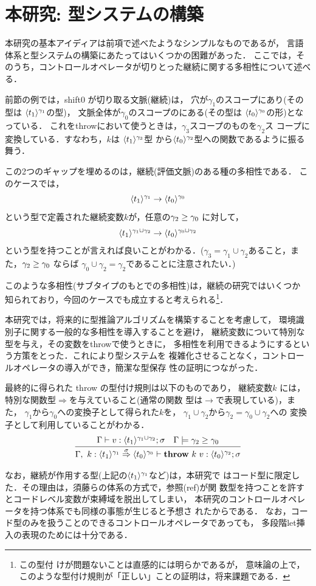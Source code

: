 \section{本研究: 型システムの構築}

本研究の基本アイディアは前項で述べたようなシンプルなものであるが，
言語体系と型システムの構築にあたってはいくつかの困難があった．
ここでは，そのうち，コントロールオペレータが切りとった継続に関する多相性について述べる．

前節の例では，shift0 が切り取る文脈(継続)は，
穴が$\gamma_1$のスコープにあり(その型は $\langle{t_1}\rangle^{\gamma_1}$の型)，
文脈全体が$\gamma_0$のスコープのにある(その型は
$\langle{t_0}\rangle^{\gamma_0}$の形)となっている．
これをthrowにおいて使うときは，$\gamma_3$スコープのものを$\gamma_2$ス
コープに変換している．すなわち，$k$は $\langle{t_1}\rangle^{\gamma_3}$型
から$\langle{t_0}\rangle^{\gamma_2}$型への関数であるように振る舞う．

この2つのギャップを埋めるのは，継続(評価文脈)のある種の多相性である．
このケースでは，
\[\langle{t_1}\rangle^{\gamma_1} \to \langle{t_0}\rangle^{\gamma_0} \]
という型で定義された継続変数$k$が，任意の$\gamma_2 \ge \gamma_0$ に対して，
\[\langle{t_1}\rangle^{\gamma_1 \cup \gamma_2} \to \langle{t_0}\rangle^{\gamma_0 \cup \gamma_2} \]
という型を持つことが言えれば良いことがわかる．($\gamma_3 = \gamma_1
\cup \gamma_2$あること，また，$\gamma_2 \ge \gamma_0$ ならば
$\gamma_0 \cup \gamma_2 = \gamma_2$であることに注意されたい．)

このような多相性(サブタイプのもとでの多相性)は，継続の研究ではいくつか
知られており，今回のケースでも成立すると考えられる\footnote{この型付
けが問題ないことは直感的には明らかであるが，
意味論の上で，このような型付け規則が「正しい」ことの証明は，将来課題である．}．

本研究では，将来的に型推論アルゴリズムを構築することを考慮して，
環境識別子に関する一般的な多相性を導入することを避け，
継続変数について特別な型を与え，その変数をthrowで使うときに，
多相性を利用できるようにするという方策をとった．これにより型システムを
複雑化させることなく，コントロールオペレータの導入ができ，簡潔な型保存
性の証明につながった．

最終的に得られた throw の型付け規則は以下のものであり，
継続変数$k$ には，特別な関数型$\Rightarrow$を与えていること(通常の関数
型は$\rightarrow$で表現している)，また，
$\gamma_1$から$\gamma_0$への変換子として得られた$k$を，
$\gamma_1\cup \gamma_2$から$\gamma_2 = \gamma_0 \cup \gamma_2$への
変換子として利用していることがわかる．
\[
  \infer
  {\Gamma,~k:\contT{\codeT{t_1}{\gamma_1}}{\codeT{t_0}{\gamma_0}}{\sigma}
    \vdash \throw{k}{v} : \codeT{t_0}{\gamma_2} ; \sigma}
  {\Gamma
    \vdash v : \codeT{t_1}{\gamma_1 \cup \gamma_2} ; \sigma
    & \Gamma \models \gamma_2 \ord \gamma_0
  }
\]

なお，継続が作用する型(上記の$\langle{t_1}\rangle^{\gamma_1}$など)は，本研究で
はコード型に限定した．その理由は，須藤らの体系の方式で，参照(ref)が関
数型を持つことを許すとコードレベル変数が束縛域を脱出してしまい，
本研究のコントロールオペレータを持つ体系でも同様の事態が生じると予想さ
れたからである．
なお，コード型のみを扱うことのできるコントロールオペレータであっても，
多段階let挿入の表現のためには十分である．

